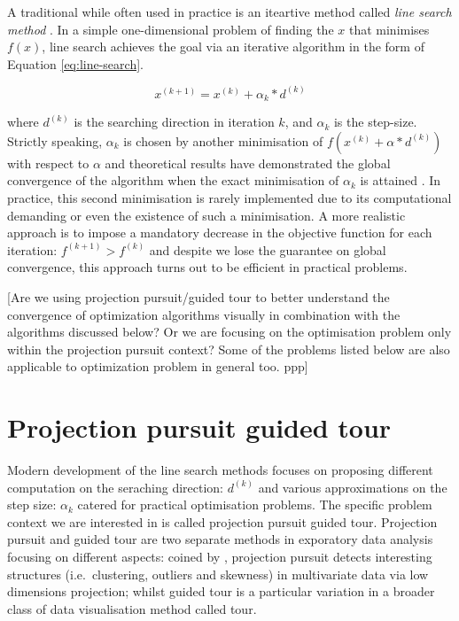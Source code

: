 \documentclass[12pt]{article}
\begin{document}
A traditional while often used in practice is an iteartive method called
\emph{line search method} \citep{fletcher2013practical}. In a simple
one-dimensional problem of finding the \(x\) that minimises \(f(x)\),
line search achieves the goal via an iterative algorithm in the form of
Equation \ref{eq:line-search}.

\begin{equation}
x^{(k + 1)} = x^{(k)} + \alpha_k* d^{(k)}
\label{eq:line-search}
\end{equation}

where \(d^{(k)}\) is the searching direction in iteration \(k\), and
\(\alpha_k\) is the step-size. Strictly speaking, \(\alpha_k\) is chosen
by another minimisation of \(f(x^{(k)} + \alpha* d^{(k)})\) with respect
to \(\alpha\) and theoretical results have demonstrated the global
convergence of the algorithm when the exact minimisation of \(\alpha_k\)
is attained \citep{curry1944method}. In practice, this second
minimisation is rarely implemented due to its computational demanding or
even the existence of such a minimisation. A more realistic approach is
to impose a mandatory decrease in the objective function for each
iteration: \(f^{(k+1)}> f^{(k)}\) and despite we lose the guarantee on
global convergence, this approach turns out to be efficient in practical
problems.

{[}Are we using projection pursuit/guided tour to better understand the
convergence of optimization algorithms visually in combination with the
algorithms discussed below? Or we are focusing on the optimisation
problem only within the projection pursuit context? Some of the problems
listed below are also applicable to optimization problem in general too.
ppp{]}

\newpage

\hypertarget{tour}{%
\section{Projection pursuit guided tour}\label{tour}}

Modern development of the line search methods focuses on proposing
different computation on the seraching direction: \(d^{(k)}\) and
various approximations on the step size: \(\alpha_k\) catered for
practical optimisation problems. The specific problem context we are
interested in is called projection pursuit guided tour. Projection
pursuit and guided tour are two separate methods in exporatory data
analysis focusing on different aspects: coined by
\citet{friedman1974projection}, projection pursuit detects interesting
structures (i.e.~clustering, outliers and skewness) in multivariate data
via low dimensions projection; whilst guided tour is a particular
variation in a broader class of data visualisation method called tour.
\end{document}
